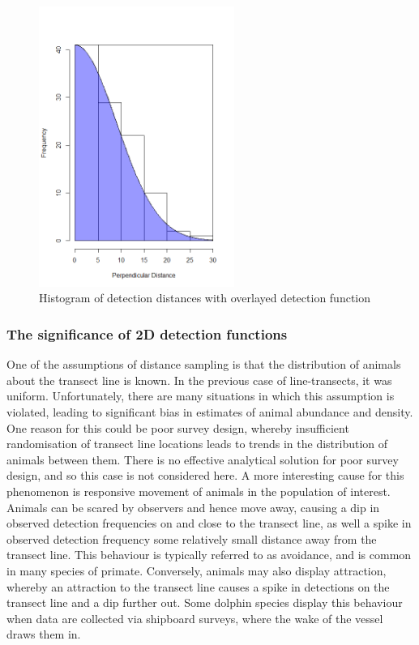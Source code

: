 \documentclass[11pt]{article}
\begin{document}
\begin{multicols}{2}
\begin{figure}[H]
\centering
\includegraphics[width=6.38cm]{DistHistDetec}
\caption{Histogram of detection distances with overlayed detection function}
\end{figure}

\subsubsection{The significance of 2D detection functions}

One of the assumptions of distance sampling is that the distribution of animals about the transect line is known. In the previous case of line-transects, it was uniform. Unfortunately, there are many situations in which this assumption is violated, leading to significant bias in estimates of animal abundance and density. One reason for this could be poor survey design, whereby insufficient randomisation of transect line locations leads to trends in the distribution of animals between them. There is no effective analytical solution for poor survey design, and so this case is not considered here. A more interesting cause for this phenomenon is responsive movement of animals in the population of interest. Animals can be scared by observers and hence move away, causing a dip in observed detection frequencies on and close to the transect line, as well a spike in observed detection frequency some relatively small distance away from the transect line. This behaviour is typically referred to as avoidance, and is common in many species of primate. Conversely, animals may also display attraction, whereby an attraction to the transect line causes a spike in detections on the transect line and a dip further out. Some dolphin species display this behaviour when data are collected via shipboard surveys, where the wake of the vessel draws them in.


\end{multicols}
\end{document}
